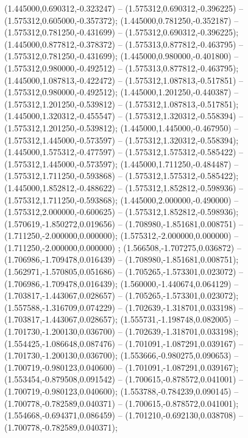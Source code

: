  (1.445000,0.690312,-0.323247) -- (1.575312,0.690312,-0.396225) -- (1.575312,0.605000,-0.357372);
 (1.445000,0.781250,-0.352187) -- (1.575312,0.781250,-0.431699) -- (1.575312,0.690312,-0.396225);
 (1.445000,0.877812,-0.378372) -- (1.575313,0.877812,-0.463795) -- (1.575312,0.781250,-0.431699);
 (1.445000,0.980000,-0.401800) -- (1.575312,0.980000,-0.492512) -- (1.575313,0.877812,-0.463795);
 (1.445000,1.087813,-0.422472) -- (1.575312,1.087813,-0.517851) -- (1.575312,0.980000,-0.492512);
 (1.445000,1.201250,-0.440387) -- (1.575312,1.201250,-0.539812) -- (1.575312,1.087813,-0.517851);
 (1.445000,1.320312,-0.455547) -- (1.575312,1.320312,-0.558394) -- (1.575312,1.201250,-0.539812);
 (1.445000,1.445000,-0.467950) -- (1.575312,1.445000,-0.573597) -- (1.575312,1.320312,-0.558394);
 (1.445000,1.575312,-0.477597) -- (1.575312,1.575312,-0.585422) -- (1.575312,1.445000,-0.573597);
 (1.445000,1.711250,-0.484487) -- (1.575312,1.711250,-0.593868) -- (1.575312,1.575312,-0.585422);
 (1.445000,1.852812,-0.488622) -- (1.575312,1.852812,-0.598936) -- (1.575312,1.711250,-0.593868);
 (1.445000,2.000000,-0.490000) -- (1.575312,2.000000,-0.600625) -- (1.575312,1.852812,-0.598936);
 (1.570619,-1.850272,0.019656) -- (1.708980,-1.851681,0.008751) -- (1.711250,-2.000000,0.000000);
 (1.575312,-2.000000,0.000000) -- (1.711250,-2.000000,0.000000) ;
 (1.566508,-1.707275,0.036872) -- (1.706986,-1.709478,0.016439) -- (1.708980,-1.851681,0.008751);
 (1.562971,-1.570805,0.051686) -- (1.705265,-1.573301,0.023072) -- (1.706986,-1.709478,0.016439);
 (1.560000,-1.440674,0.064129) -- (1.703817,-1.443067,0.028657) -- (1.705265,-1.573301,0.023072);
 (1.557588,-1.316709,0.074229) -- (1.702639,-1.318701,0.033198) -- (1.703817,-1.443067,0.028657);
 (1.555731,-1.198748,0.082005) -- (1.701730,-1.200130,0.036700) -- (1.702639,-1.318701,0.033198);
 (1.554425,-1.086648,0.087476) -- (1.701091,-1.087291,0.039167) -- (1.701730,-1.200130,0.036700);
 (1.553666,-0.980275,0.090653) -- (1.700719,-0.980123,0.040600) -- (1.701091,-1.087291,0.039167);
 (1.553454,-0.879508,0.091542) -- (1.700615,-0.878572,0.041001) -- (1.700719,-0.980123,0.040600);
 (1.553788,-0.784239,0.090145) -- (1.700778,-0.782589,0.040371) -- (1.700615,-0.878572,0.041001);
 (1.554668,-0.694371,0.086459) -- (1.701210,-0.692130,0.038708) -- (1.700778,-0.782589,0.040371);
